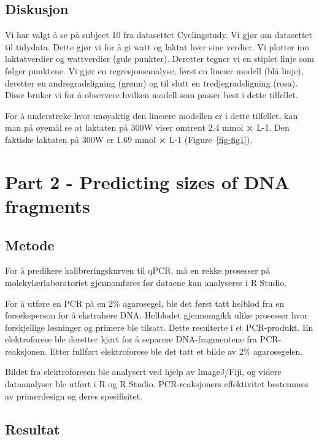 \documentclass[
  letterpaper,
  DIV=11,
  numbers=noendperiod]{scrreprt}
\begin{document}
\subsection{Diskusjon}\label{diskusjon-1}

Vi har valgt å se på subject 10 fra datasettet Cyclingstudy. Vi gjør om
datasettet til tidydata. Dette gjør vi for å gi watt og laktat hver sine
verdier. Vi plotter inn laktatverdier og wattverdier (gule punkter).
Deretter tegner vi en stiplet linje som følger punktene. Vi gjør en
regresjonsanalyse, først en lineær modell (blå linje), deretter en
andregradsligning (grønn) og til slutt en tredjegradsligning (rosa).
Disse bruker vi for å observere hvilken modell som passer best i dette
tilfellet.

For å understreke hvor unøyaktig den lineære modellen er i dette
tilfellet, kan man på øyemål se at laktaten på 300W viser omtrent 2.4
mmol \textbf{×} L-1. Den faktiske laktaten på 300W er 1.69 mmol
\textbf{×} L-1 (Figure~\ref{fig-fig1}).

\section{Part 2 - Predicting sizes of DNA
fragments}\label{part-2---predicting-sizes-of-dna-fragments}

\subsection{Metode}\label{metode-2}

For å predikere kalibreringskurven til qPCR, må en rekke prosesser på
molekylærlaboratoriet gjennomføres før dataene kan analyseres i R
Studio.

For å utføre en PCR på en 2\% agarosegel, ble det først tatt helblod fra
en forsøksperson for å ekstrahere DNA. Helblodet gjennomgikk ulike
prosesser hvor forskjellige løsninger og primere ble tilsatt. Dette
resulterte i et PCR-produkt. En elektroforese ble deretter kjørt for å
separere DNA-fragmentene fra PCR-reaksjonen. Etter fullført
elektroforese ble det tatt et bilde av 2\% agarosegelen.

Bildet fra elektroforesen ble analysert ved hjelp av ImageJ/Fiji, og
videre dataanalyser ble utført i R og R Studio. PCR-reaksjoners
effektivitet bestemmes av primerdesign og deres spesifisitet.

\subsection{Resultat}\label{resultat-2}
\end{document}
